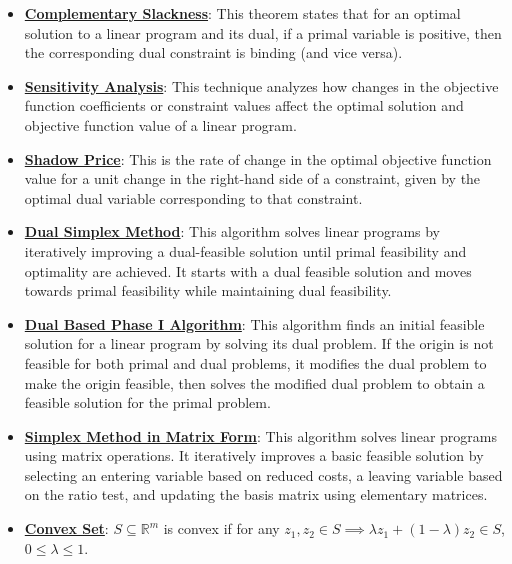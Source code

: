 \documentclass{article}%
\begin{document}
\begin{itemize}[leftmargin=*]
\item \href{https://www.math.purdue.edu/~yipn/421/2024-10-01-SensitivityDuality.pdf#page=3}{\textbf{Complementary Slackness}}: This theorem states that for an optimal solution to a linear program and its dual, if a primal variable is positive, then the corresponding dual constraint is binding (and vice versa).%
\item \href{https://www.math.purdue.edu/~yipn/421/2024-10-01-SensitivityDuality.pdf#page=1}{\textbf{Sensitivity Analysis}}: This technique analyzes how changes in the objective function coefficients or constraint values affect the optimal solution and objective function value of a linear program.%
\item \href{https://www.math.purdue.edu/~yipn/421/2024-10-01-SensitivityDuality.pdf#page=10}{\textbf{Shadow Price}}: This is the rate of change in the optimal objective function value for a unit change in the right-hand side of a constraint, given by the optimal dual variable corresponding to that constraint.%
\item \href{https://www.math.purdue.edu/~yipn/421/2024-10-03-DualSimplexMatrix.pdf#page=2}{\textbf{Dual Simplex Method}}: This algorithm solves linear programs by iteratively improving a dual-feasible solution until primal feasibility and optimality are achieved. It starts with a dual feasible solution and moves towards primal feasibility while maintaining dual feasibility. %
\item \href{https://www.math.purdue.edu/~yipn/421/2024-10-03-DualSimplexMatrix.pdf#page=5}{\textbf{Dual Based Phase I Algorithm}}: This algorithm finds an initial feasible solution for a linear program by solving its dual problem. If the origin is not feasible for both primal and dual problems, it modifies the dual problem to make the origin feasible, then solves the modified dual problem to obtain a feasible solution for the primal problem. %
\item \href{https://www.math.purdue.edu/~yipn/421/2024-10-03-DualSimplexMatrix.pdf#page=7}{\textbf{Simplex Method in Matrix Form}}: This algorithm solves linear programs using matrix operations. It iteratively improves a basic feasible solution by selecting an entering variable based on reduced costs, a leaving variable based on the ratio test, and updating the basis matrix using elementary matrices. %
\item \href{https://www.math.purdue.edu/~yipn/421/2024-10-22-Convexity.pdf#page=1}{\textbf{Convex Set}}: $S \subseteq \mathbb{R}^m$ is convex if for any $z_1, z_2 \in S \implies \lambda z_1 + (1-\lambda) z_2 \in S$, $0 \le \lambda \le 1$.%

\end{itemize}
\end{document}

